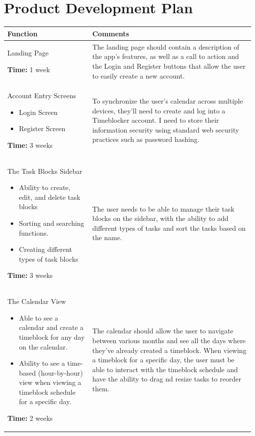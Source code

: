 \documentclass[12pt]{report}
\begin{document}
\section*{Product Development Plan}
\def\arraystretch{1.5}
\begin{xltabular}{\textwidth}{|X|X|}
  \hline
  Function
   & Comments
  \\\hline
  Landing Page

  \medskip

  \textbf{Time:} 1 week
  &
  The landing page should contain a description of the app's features, as well as a call to action and the Login and Register buttons that allow the user to easily create a new account.
  \\\hline
  Account Entry Screens
  \begin{itemize}
    \item Login Screen
    \item Register Screen
  \end{itemize}
  \textbf{Time:} 3 weeks
   &
  To synchronize the user's calendar across multiple devices, they’ll need to create and log into a Timeblocker account. I need to store their information security using standard web security practices such as password hashing.
  \\\hline
  The Task Blocks Sidebar
  \begin{itemize}
    \item Ability to create, edit, and delete task blocks
    \item Sorting and searching functions.
    \item Creating different types of task blocks
  \end{itemize}
  \textbf{Time:} 3 weeks
   &
  The user needs to be able to manage their task blocks on the sidebar, with the ability to add different types of tasks and sort the tasks based on the name.
  \\\hline
  The Calendar View
  \begin{itemize}
    \item Able to see a calendar and create a timeblock for any day on the calendar.
    \item Ability to see a time-based (hour-by-hour) view when viewing a timeblock schedule for a specific day.
  \end{itemize}
  \textbf{Time:} 2 weeks
   &
  The calendar should allow the user to navigate between various months and see all the days where they've already created a timeblock. When viewing a timeblock for a specific day, the user must be able to interact with the timeblock schedule and have the ability to drag nd resize tasks to reorder them.
  \\\hline
\end{xltabular}
\end{document}
